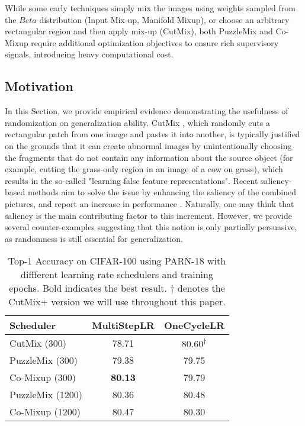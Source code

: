 \documentclass[letterpaper]{article} \usepackage[submission]{aaai23}  \usepackage{times}  \usepackage{helvet}  \usepackage{courier}  \usepackage[hyphens]{url}  \usepackage{graphicx} \urlstyle{rm} \def\UrlFont{\rm}  \usepackage{natbib}  \usepackage{caption} \frenchspacing  \setlength{\pdfpagewidth}{8.5in} \setlength{\pdfpageheight}{11in}
\newcommand{\mixup}{Input Mix-up}
\newcommand{\cutmix}{{CutMix}}
\newcommand{\puzzlemix}{{PuzzleMix}}
\newcommand{\comixup}{{Co-Mixup}}
\newcommand{\manifoldmixup}{{Manifold Mixup}}
\newcommand{\cifar}{CIFAR-100}
\begin{document}
While some early techniques simply mix the images using weights sampled from the $Beta$ distribution (\mixup{}, \manifoldmixup{}), or choose an arbitrary rectangular region and then apply mix-up (\cutmix{}), both \puzzlemix{} and \comixup{} require additional optimization objectives to ensure rich supervisory signals, introducing heavy computational cost.


\subsection{Motivation}
\label{sec:motivation}
In this Section, we provide empirical evidence demonstrating the usefulness of randomization on generalization ability. \cutmix{} \cite{yun2019cutmix}, which randomly cuts a rectangular patch from one image and pastes it into another, is typically justified on the grounds that it can create abnormal images by unintentionally choosing the fragments that do not contain any information about the source object (for example, cutting the grass-only region in an image of a cow on grass), which results in the so-called "learning false feature representations". Recent saliency-based methods aim to solve the issue by enhancing the saliency of the combined pictures, and report an increase in performance \cite{uddin2021saliencymix,kim2020puzzlemix,mixup9,kim2021comixup}. Naturally, one may think that saliency is the main contributing factor to this increment. However, we provide several counter-examples suggesting that this notion is only partially persuasive, as randomness is still essential for generalization.

\begin{table}[t!]
\centering
\begin{tabular}{lcc}
    \hline
    Scheduler & MultiStepLR & OneCycleLR \\ \hline
    CutMix (300) & 78.71 & $\mathbf{80.60^\dagger}$\\ 
    PuzzleMix (300) & 79.38 & 79.75 \\ 
    Co-Mixup (300) & \textbf{80.13} & 79.79 \\ \hline
    PuzzleMix (1200) & 80.36 & 80.48 \\ 
    Co-Mixup (1200) &80.47 & 80.30 \\ \hline
  \end{tabular}


  \caption{Top-1 Accuracy on \cifar{} using PARN-18 with diffferent learning rate schedulers and training epochs. Bold indicates the best result. $\dagger$ denotes the \cutmix{}+ version we will use throughout this paper.}
  \label{tab:schedulersPARN}
\end{table}
 
\end{document}
